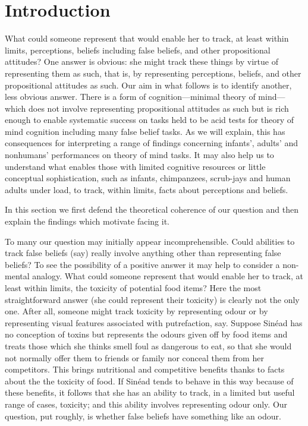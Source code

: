 \documentclass[12pt,\papersize]{extarticle}
\begin{document}
\section{Introduction}
What could someone represent that would enable her to track, at least within limits, perceptions, beliefs including false beliefs, and other propositional attitudes? 
One answer is obvious: she might track these things by virtue of representing them as such, that is, by representing perceptions, beliefs, and other propositional attitudes as such.
Our aim in what follows is to identify another, less obvious answer.
There is a form of cognition---minimal theory of mind---which does not involve representing propositional attitudes as such but is  rich enough to enable systematic success on tasks held to be acid tests for theory of mind cognition including many false belief tasks.
As we will explain, this has consequences 
for interpreting a range of findings concerning infants', adults' and nonhumans' performances on theory of mind tasks.
It may also help us to understand what enables those with limited cognitive resources or little conceptual sophistication, such as infants, chimpanzees, scrub-jays and human adults under load, to track, within limits, facts about perceptions and beliefs.

In this section we first defend the theoretical coherence of our question and then explain the findings which motivate facing it.

To many our question may initially appear incomprehensible.
Could abilities to track false beliefs (say) really involve anything other than representing false beliefs?
To see the possibility of a positive answer it may help to consider a non-mental analogy.
What could someone represent that would enable her to track, at least within limits, the toxicity of potential food items?
Here the most straightforward answer (she could represent their toxicity) is clearly not the only one.
After all, someone might track toxicity by representing odour or by representing visual features associated with putrefaction, say.
Suppose Sin\'ead has no conception of toxins but represents the odours given off by food items and 
treats those which she thinks smell foul as dangerous to eat,
so that she would not normally offer them to friends or family
nor conceal them from her competitors.
This brings nutritional and competitive benefits thanks to facts about the the toxicity of food.
If Sin\'ead tends to behave in this way because of these benefits, 
it follows that she has an ability to track, in a limited but useful range of cases,  toxicity; and this ability involves  representing  odour only.
Our question, put roughly, is whether false beliefs have something like an odour.
\end{document}
